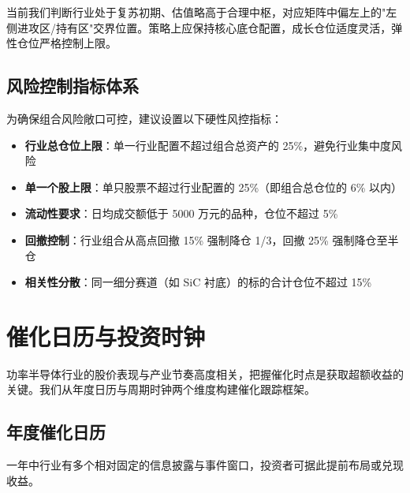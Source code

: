 当前我们判断行业处于复苏初期、估值略高于合理中枢，对应矩阵中偏左上的"左侧进攻区/持有区"交界位置。策略上应保持核心底仓配置，成长仓位适度灵活，弹性仓位严格控制上限。

\subsection{风险控制指标体系}

为确保组合风险敞口可控，建议设置以下硬性风控指标：

\vspace{0.2em}
\begin{itemize}[leftmargin=2em]
\item \textbf{行业总仓位上限}：单一行业配置不超过组合总资产的 25\%，避免行业集中度风险
\item \textbf{单一个股上限}：单只股票不超过行业配置的 25\%（即组合总仓位的 6\% 以内）
\item \textbf{流动性要求}：日均成交额低于 5000 万元的品种，仓位不超过 5\%
\item \textbf{回撤控制}：行业组合从高点回撤 15\% 强制降仓 1/3，回撤 25\% 强制降仓至半仓
\item \textbf{相关性分散}：同一细分赛道（如 SiC 衬底）的标的合计仓位不超过 15\%
\end{itemize}

\section{催化日历与投资时钟}

功率半导体行业的股价表现与产业节奏高度相关，把握催化时点是获取超额收益的关键。我们从年度日历与周期时钟两个维度构建催化跟踪框架。

\subsection{年度催化日历}

一年中行业有多个相对固定的信息披露与事件窗口，投资者可据此提前布局或兑现收益。


